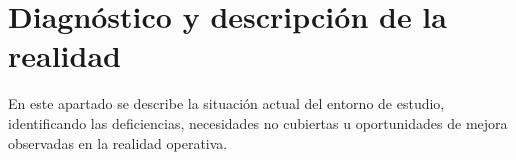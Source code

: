 \section{Diagnóstico y descripción de la realidad}
\label{sec:diagnostico}
En este apartado se describe la situación actual del entorno de estudio, identificando las deficiencias, necesidades no cubiertas u oportunidades de mejora observadas en la realidad operativa.
